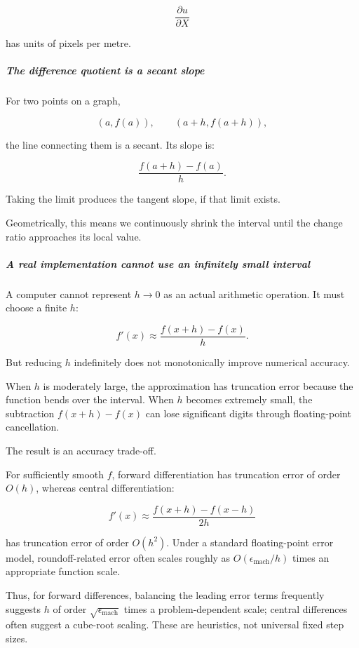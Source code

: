 \[
\frac{\partial u}{\partial X}
\]

has units of pixels per metre.

\subparagraph{The difference quotient is a secant slope}\label{01-foundations-i-ch020-the-difference-quotient-is-a-secant-slope}

\hypertarget{01-foundations-i-ch020-the-difference-quotient-is-a-secant-slope}{}

For two points on a graph,

\[
(a,f(a)),\qquad(a+h,f(a+h)),
\]

the line connecting them is a secant. Its slope is:

\[
\frac{f(a+h)-f(a)}h.
\]

Taking the limit produces the tangent slope, if that limit exists.

Geometrically, this means we continuously shrink the interval until the change ratio approaches its local value.

\subparagraph{A real implementation cannot use an infinitely small interval}\label{01-foundations-i-ch020-a-real-implementation-cannot-use-an-infinitely-small-interval}

\hypertarget{01-foundations-i-ch020-a-real-implementation-cannot-use-an-infinitely-small-interval}{}

A computer cannot represent \(h\to0\) as an actual arithmetic operation. It must choose a finite \(h\):

\[
f'(x)\approx\frac{f(x+h)-f(x)}h.
\]

But reducing \(h\) indefinitely does not monotonically improve numerical accuracy.

When \(h\) is moderately large, the approximation has truncation error because the function bends over the interval. When \(h\) becomes extremely small, the subtraction \(f(x+h)-f(x)\) can lose significant digits through floating-point cancellation.

The result is an accuracy trade-off.

For sufficiently smooth \(f\), forward differentiation has truncation error of order \(O(h)\), whereas central differentiation:

\[
f'(x)\approx\frac{f(x+h)-f(x-h)}{2h}
\]

has truncation error of order \(O(h^2)\). Under a standard floating-point error model, roundoff-related error often scales roughly as \(O(\epsilon_{\mathrm{mach}}/h)\) times an appropriate function scale.

Thus, for forward differences, balancing the leading error terms frequently suggests \(h\) of order \(\sqrt{\epsilon_{\mathrm{mach}}}\) times a problem-dependent scale; central differences often suggest a cube-root scaling. These are heuristics, not universal fixed step sizes.

